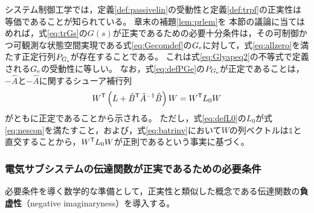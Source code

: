 \documentclass[tombow,dvipdfmx]{corona-a5-1.1}
\begin{document}
システム制御工学では，定義\ref{def:passivelin}の受動性と定義\ref{def:trpf}の正実性は等価であることが知られている。
章末の補題\ref{lem:prlem}を
本節の議論に当てはめれば，式\ref{eq:trGs}の$G(s)$が正実であるための必要十分条件は，その可制御かつ可観測な状態空間実現である式\ref{eq:Gecomdef}の$G_{\rm e}$に対して，式\ref{eq:allzero}を満たす正定行列$P_{G_{\rm e}}$が存在することである。
これは式\ref{eq:Glyapeq2}の不等式で定義される$G_{\rm e}$の受動性に等しい。
なお，式\ref{eq:defPGe}の$P_{G_{\rm e}}$が正定であることは，$-\hat{A}$と$-\hat{A}$に関するシューア補行列
\[
W^{\sf T} \left(L+\hat{B}^{\sf T} \hat{A}^{-1} \hat{B} \right) W
=  W^{\sf T} L_0 W
\]
がともに正定であることから示される。
ただし，式\ref{eq:defL0}の$L_0$が式\ref{eq:nescon}を満たすこと，および，式\ref{eq:batrinv}において$W$の列ベクトルは$\mathds{1}$と直交することから，$W^{\sf T} L_0 W$が正則であるという事実に基づく。




\smallskip
\subsubsection{電気サブシステムの伝達関数が正実であるための必要条件}


必要条件を導く数学的な準備として，正実性と類似した概念である伝達関数の\textbf{負虚性}（negative imaginaryness）を導入する\cite{petersen2010feedback,xiong2010negative}。
\end{document}
